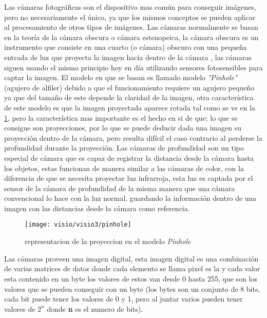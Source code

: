     
    Las cámaras fotográficas son el dispositivo mas común para conseguir imágenes, pero no necesariamente el único, ya que los mismos conceptos se pueden aplicar al procesamiento de otros tipos de imágenes.
    Las cámaras normalmente se basan en la teoría de la cámara obscura o cámara estenopeica, la cámara obscura es un instrumento que consiste en una cuarto (o cámara) obscuro con una pequeña entrada de luz que proyecta la imagen hacia dentro de la cámara , las cámaras siguen usando el mismo principio hoy en día utilizando sensores fotosensibles para captar la imagen. El modelo en que se basan es llamado modelo \textit{"Pinhole"} (agujero de alfiler) debido a que el funcionamiento requiere un agujero pequeño ya que del tamaño de este depende la claridad de la imagen, otra característica de este modelo es que la imagen proyectada aparece rotada tal como se ve en la \cref{fig:pinhole}, pero la característica mas importante es el hecho en si de que; lo que se consigue son proyecciones, por lo que se puede deducir dada una imagen su proyección dentro de la cámara, pero resulta difícil el caso contrario al perderse la profundidad durante la proyección. Las cámaras de profundidad son un tipo especial de cámara que es capaz de registrar la distancia desde la cámara hasta los objetos, estas funcionan de manera similar a las cámaras de color, con la diferencia de que se necesita proyectar luz  infrarroja, esta luz es captada por el sensor de la cámara de profundidad de la misma manera que una cámara convencional lo hace con la luz normal, guardando la información dentro de una imagen con las distancias desde la cámara como referencia.
    
\begin{figure}[h]
	\centering
	\texttt{[image: visio/visio3/pinhole]}
	\caption{representacion de la proyeccion en el modelo \textit{Pinhole}}
	\label{fig:pinhole}
\end{figure}
     
    Las cámaras proveen una imagen digital, esta imagen digital es una combinación de varias matrices de datos donde cada elemento se llama pixel es la y cada valor esta contenido en un byte los valores de estos van desde 0 hasta 255, que son los valores que se pueden conseguir con un byte (los bytes son un conjunto de 8 bits, cada bit puede tener los valores de 0 y 1, pero al juntar varios pueden tener valores de $2^n$ donde \textbf{n} es el numero de bits).
    
